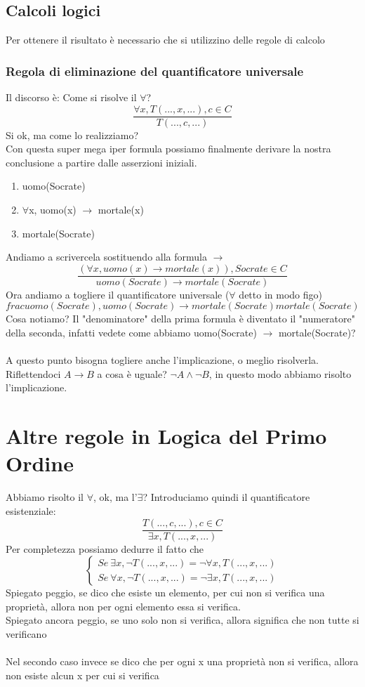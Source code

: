 \documentclass[12pt, a4paper, openany, oneside]{book}
\begin{document}
\subsection{Calcoli logici}
Per ottenere il risultato è necessario che si utilizzino delle regole di
calcolo %
\subsubsection{Regola di eliminazione del quantificatore universale}
Il discorso è: Come si risolve il $\forall$?
\[\frac{\forall x, T(..., x, ...), c\in C}{T(..., c, ...)} \]
Si ok, ma come lo realizziamo?  \\ 
Con questa super mega iper formula possiamo finalmente derivare la nostra
conclusione a partire dalle asserzioni iniziali. 
\begin{enumerate}
	\item uomo(Socrate)
	\item $\forall$x, uomo(x) $\to$ mortale(x)
	\item mortale(Socrate)
\end{enumerate}
Andiamo a scrivercela sostituendo alla formula $\to$
\[\frac{(\forall x, uomo(x) \to mortale(x)), Socrate\in C}{uomo(Socrate)\to 
mortale(Socrate)}\]
Ora andiamo a togliere il quantificatore universale ($\forall$ detto in modo figo)
\[frac{uomo(Socrate), uomo(Socrate) \to mortale(Socrate)}{mortale(Socrate)}\]
Cosa notiamo? Il "denominatore" della prima formula è diventato il "numeratore"
della seconda, infatti vedete come abbiamo uomo(Socrate) $\to$ mortale(Socrate)?
\\ \\
A questo punto bisogna togliere anche l'implicazione, o meglio risolverla. 
Riflettendoci $A \to B$ a cosa è uguale? $\neg A \wedge \neg B$, in questo
modo abbiamo risolto l'implicazione.
\section{Altre regole in Logica del Primo Ordine}
Abbiamo risolto il $\forall$, ok, ma l'$\exists$?
Introduciamo quindi il quantificatore esistenziale:
\[
\frac{T(..., c, ...), c\in C}{\exists x, T(..., x, ...)} 
\]
Per completezza possiamo dedurre il fatto che 
\[
\begin{cases}
Se ~ \exists x, \neg T(..., x, ...) = \neg \forall x, T(..., x, ...) \\
Se ~ \forall x, \neg T(..., x, ...) = \neg \exists x, T(..., x, ...)
\end{cases} 
\]
Spiegato peggio, se dico che esiste un elemento, per cui non si verifica una 
proprietà, allora non per ogni elemento essa si verifica. \\ 
Spiegato ancora peggio, se uno solo non si verifica, allora significa che non 
tutte si verificano \\ \\
Nel secondo caso invece se dico che per ogni x una proprietà non si verifica,
allora non esiste alcun x per cui si verifica 
\end{document}
